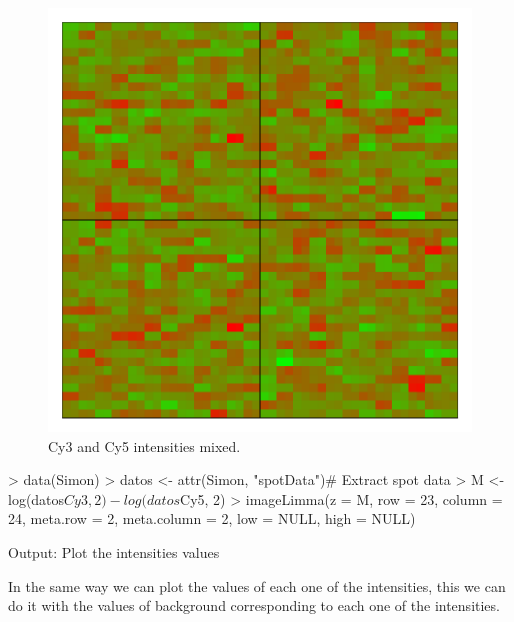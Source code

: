 \documentclass[12pt]{article}
\begin{document}
\begin{figure}[h]
\begin{center}
\includegraphics{example-genArise-003}
\caption{Cy3 and Cy5 intensities mixed.\label{fig1}}
\end{center}
\end{figure}
\begin{Scode}
> data(Simon)
> datos <- attr(Simon, "spotData")# Extract spot data
> M <- log(datos$Cy3, 2) - log(datos$Cy5, 2)
> imageLimma(z = M, row = 23, column = 24, meta.row = 2, 
  meta.column = 2, low = NULL, high = NULL)
\end{Scode}

\begin{Soutput}
Output: Plot the intensities values
\end{Soutput}

In the same way we can plot the values of each one of the intensities, this we can do it with the values of background corresponding to each one of the intensities.\\
\end{document}
